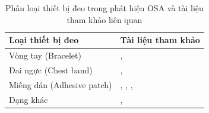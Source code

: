 \begin{table}[htbp]
  \centering
  \caption{Phân loại thiết bị đeo trong phát hiện OSA và tài liệu tham khảo liên quan}
  \label{tab:wearable_types}
  \begin{tabular}{|p{5.5cm}|p{7.5cm}|}
    \hline
    \textbf{Loại thiết bị đeo} & \textbf{Tài liệu tham khảo}                                                                                                          \\
    \hline
    Vòng tay (Bracelet)        & \cite{jeon2020realtime}, \cite{shen2022mtcnn} \cite{e3hst} \cite{osa_sanchez2025}                                                    \\
    \hline
    Đai ngực (Chest band)      & \cite{svmHSt2017}, \cite{chen2024hdc} \cite{e3hst} \cite{osa_sanchez2025}                                                            \\
    \hline
    Miếng dán (Adhesive patch) & \cite{Vu2025SleepPosition}, \cite{yeo2022resnet}, \cite{yeo2022respiratory}, \cite{p_3} \cite{osa_sanchez2025}                       \\
    \hline
    Dạng khác                  & \cite{Sleep_Posture_Detection}, \cite{hst_wear_paper} \cite{osa_sanchez2025} \cite{hstSurvey} \cite{hst_paper} \cite{hst_wear_paper} \\
    \hline
  \end{tabular}
\end{table}

